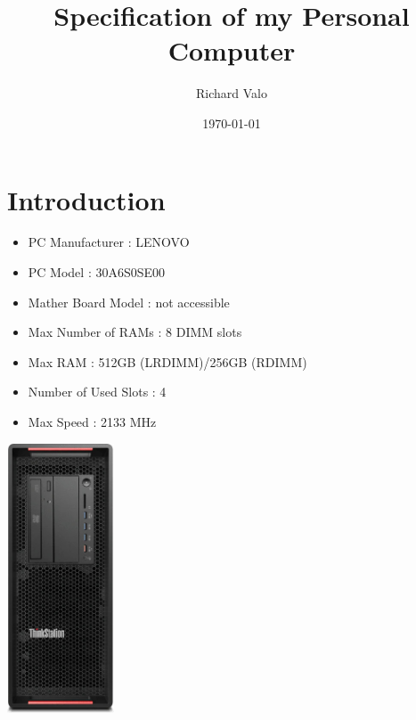 \documentclass{article}
\title{Specification of my Personal Computer}
\author{Richard Valo}
\date{\today}
\begin{document}
\maketitle

\section{Introduction}
\begin{itemize}
  \item PC Manufacturer         : LENOVO
  \item PC Model                : 30A6S0SE00
  \item Mather Board Model   : not accessible
  \item Max Number of RAMs   : 8 DIMM slots
  \item Max RAM              : 512GB (LRDIMM)/256GB (RDIMM)
  \item Number of Used Slots : 4
  \item Max Speed            : 2133 MHz
\end{itemize}
\href{https://www.getech.co.uk/pdf/p5001.pdf}{\includegraphics[height=8cm]{PC.jpg}}
\end{document}
